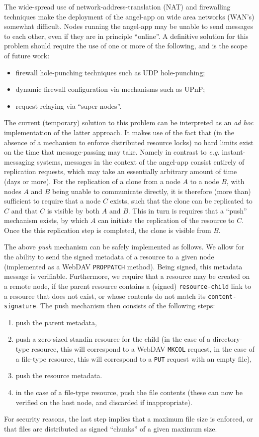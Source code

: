 \documentclass[11pt]{article}
\begin{document}
\begin{mainmatter}
The wide-spread use of network-address-translation (NAT) and firewalling techniques make the deployment of the angel-app on wide area networks (WAN's) somewhat difficult. Nodes running the angel-app may be unable to send messages to each other, even if they are in principle ``online''. A definitive solution for this problem should require the use of one or more of the following, and is the scope of future work:
\begin{itemize}
\item firewall hole-punching techniques such as UDP hole-punching;
\item dynamic firewall configuration via mechanisms such as UPnP;
\item request relaying via ``super-nodes''.
\end{itemize}
The current (temporary) solution to this problem can be interpreted as an \emph{ad hoc} implementation of the latter approach. It makes use of the fact that (in the absence of a mechanism to enforce distributed resource locks) no hard limits exist on the time that message-passing may take. Namely in contrast to \emph{e.g.} instant-messaging systems, messages in the context of the angel-app consist entirely of replication requests, which may take an essentially arbitrary amount of time (days or more). For the replication of a clone from a node $A$ to a node $B$, with nodes $A$ and $B$ being unable to communicate directly, it is therefore (more than) sufficient to require that a node $C$ exists, such that the clone can be replicated to $C$ and that $C$ is visible by both $A$ and $B$. This in turn is requires that a ``push'' mechanism exists, by which $A$ can initiate the replication of the resource to $C$. Once the this replication step is completed, the clone is visible from $B$.

The above \emph{push} mechanism can be safely implemented as follows. We allow for the ability to send the signed metadata of a resource to a given node (implemented as a WebDAV \texttt{PROPPATCH} method). Being signed, this metadata message is verifiable. Furthermore, we require that a resource may be created on a remote node, if the parent resource contains a (signed) \texttt{resource-child} link to a resource that does not exist, or whose contents do not match its \texttt{content-signature}. The push mechanism then consists of the following steps:
\begin{enumerate}
\item push the parent metadata,
\item push a zero-sized standin resource for the child (in the case of a directory-type resource, this will correspond to a WebDAV \texttt{MKCOL} request, in the case of a file-type resource, this will correspond to a \texttt{PUT} request with an empty file),
\item push the resource metadata.
\item in the case of a file-type resource, push the file contents (these can now be verified on the host node, and discarded if inappropriate). 
\end{enumerate}
For security reasons, the last step implies that a maximum file size is enforced, or that files are distributed as signed ``chunks'' of a given maximum size.


\end{mainmatter}
\end{document}
